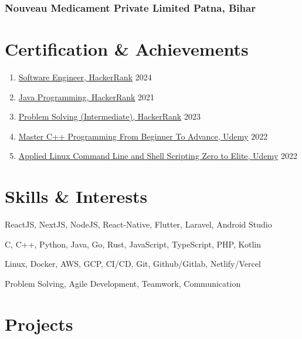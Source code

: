 \documentclass[11pt]{article}
\begin{document}
\subsubsection{Nouveau Medicament Private Limited \hfill Patna, Bihar}

\vspace{18pt}

\section{Certification \& Achievements}
\begin{enumerate}[label=\null, left=0pt..0pt, itemsep=0pt]
	\item \href{https://www.hackerrank.com/certificates/94e6bf2ca0ff}{Software Engineer, HackerRank} \hfill 2024
	\item \href{https://www.hackerrank.com/certificates/d93d5797f424}{Java Programming, HackerRank} \hfill 2021
	\item \href{https://www.hackerrank.com/certificates/9d44af68b27a}{Problem Solving (Intermediate), HackerRank} \hfill 2023
	\item \href{https://www.udemy.com/certificate/UC-c3680df9-3c96-4452-a8d3-9467ba731603/}{Master C++ Programming From Beginner To Advance, Udemy} \hfill 2022
	\item \href{https://www.udemy.com/certificate/UC-29ae3a1d-06ca-4295-8dd9-1602c188b343/}{Applied Linux Command Line and Shell Scripting Zero to Elite, Udemy} \hfill 2022
\end{enumerate}

\section{Skills \& Interests}
\begin{description}[itemsep=0pt]
	\item[Frameworks \& Stacks] ReactJS, NextJS, NodeJS, React-Native, Flutter, Laravel, Android Studio
	\item[Programming] C, C++, Python, Java, Go, Rust, JavaScript, TypeScript, PHP, Kotlin
	\item[DevOps] Linux, Docker, AWS, GCP, CI/CD, Git, Github/Gitlab, Netlify/Vercel
  \item[Soft Skills] Problem Solving, Agile Development, Teamwork, Communication
\end{description}

\section{Projects}
\end{document}
